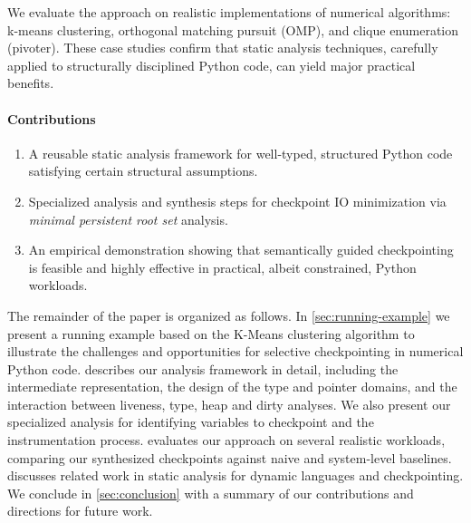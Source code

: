 We evaluate the approach on realistic implementations of numerical algorithms: k-means clustering, orthogonal matching pursuit (OMP), and clique enumeration (pivoter). These case studies confirm that static analysis techniques, carefully applied to structurally disciplined Python code, can yield major practical benefits.


\paragraph{Contributions}
\begin{enumerate}
\item A reusable static analysis framework for well-typed, structured Python code satisfying certain structural assumptions.
\item Specialized analysis and synthesis steps for checkpoint IO minimization via \emph{minimal persistent root set} analysis.
\item An empirical demonstration showing that semantically guided checkpointing is feasible and highly effective in practical, albeit constrained, Python workloads.
\end{enumerate}

The remainder of the paper is organized as follows. In \cref{sec:running-example} we present a running example based on the K-Means clustering algorithm to illustrate the challenges and opportunities for selective checkpointing in numerical Python code.  describes our analysis framework in detail, including the intermediate representation, the design of the type and pointer domains, and the interaction between liveness, type, heap and dirty analyses. We also present our specialized analysis for identifying variables to checkpoint and the instrumentation process.  evaluates our approach on several realistic workloads, comparing our synthesized checkpoints against naive and system-level baselines.  discusses related work in static analysis for dynamic languages and checkpointing. We conclude in \cref{sec:conclusion} with a summary of our contributions and directions for future work.
